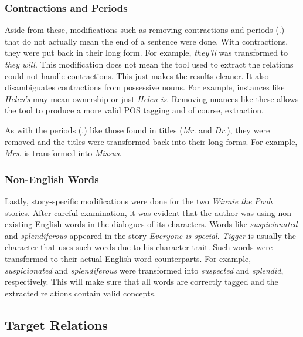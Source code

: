 \subsubsection*{Contractions and Periods}

Aside from these, modifications such as removing contractions and periods (.) that do not actually mean the end of a sentence were done. With contractions, they were put back in their long form. For example, \textit{they'll} was transformed to \textit{they will}. This modification does not mean the tool used to extract the relations could not handle contractions. This just makes the results cleaner. It also disambiguates contractions from possessive nouns. For example, instances like \textit{Helen's} may mean ownership or just \textit{Helen is}. Removing nuances like these allows the tool to produce a more valid POS tagging and of course, extraction. 

As with the periods (.) like those found in titles (\textit{Mr.} and \textit{Dr.}), they were removed and the titles were transformed back into their long forms. For example, \textit{Mrs.} is transformed into \textit{Missus}. 

\subsubsection*{Non-English Words}

Lastly, story-specific modifications were done for the two \textit{Winnie the Pooh} stories. After careful examination, it was evident that the author was using non-existing English words in the dialogues of its characters. Words like \textit{suspicionated} and \textit{splendiferous} appeared in the story \textit{Everyone is special}. \textit{Tigger} is usually the character that uses such words due to his character trait. Such words were transformed to their actual English word counterparts. For example, \textit{suspicionated} and \textit{splendiferous} were transformed into \textit{suspected} and \textit{splendid}, respectively. This will make sure that all words are correctly tagged and the extracted relations contain valid concepts.

\subsection{Target Relations}
\label{sec:relations}

